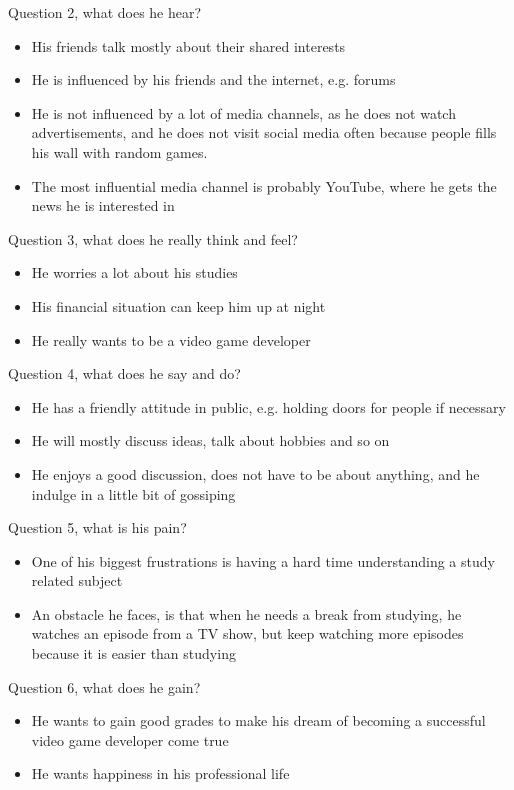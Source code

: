Question 2, what does he hear?
\begin{itemize}
\item His friends talk mostly about their shared interests
\item He is influenced by his friends and the internet, e.g. forums
\item He is not influenced by a lot of media channels, as he does not watch advertisements, and he does not visit social media often because people fills his wall with random games.
\item The most influential media channel is probably YouTube, where he gets the news he is interested in
\end{itemize}

Question 3, what does he really think and feel?
\begin{itemize}
\item He worries a lot about his studies
\item His financial situation can keep him up at night
\item He really wants to be a video game developer
\end{itemize}

Question 4, what does he say and do?
\begin{itemize}
\item He has a friendly attitude in public, e.g. holding doors for people if necessary
\item He will mostly discuss ideas, talk about hobbies and so on
\item He enjoys a good discussion, does not have to be about anything, and he indulge in a little bit of gossiping 
\end{itemize}

Question 5, what is his pain?
\begin{itemize}
\item One of his biggest frustrations is having a hard time understanding a study related subject
\item An obstacle he faces, is that when he needs a break from studying, he watches an episode from a TV show, but keep watching more episodes because it is easier than studying
\end{itemize}

Question 6, what does he gain?
\begin{itemize}
\item He wants to gain good grades to make his dream of becoming a successful video game developer come true
\item He wants happiness in his professional life
\end{itemize}
